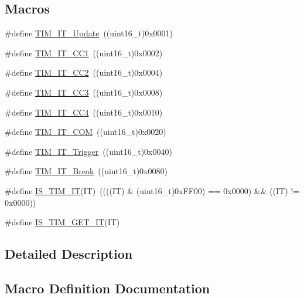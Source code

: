\subsection*{Macros}
\begin{DoxyCompactItemize}
\item 
\#define \hyperlink{group___t_i_m__interrupt__sources_ga8fb63577fec9a3e7c7f5f3eb775ee624}{T\+I\+M\+\_\+\+I\+T\+\_\+\+Update}~((uint16\+\_\+t)0x0001)
\item 
\#define \hyperlink{group___t_i_m__interrupt__sources_ga02267a938ab4722c5013fffa447cf5a6}{T\+I\+M\+\_\+\+I\+T\+\_\+\+C\+C1}~((uint16\+\_\+t)0x0002)
\item 
\#define \hyperlink{group___t_i_m__interrupt__sources_ga60f6b6c424b62ca58d3fafd8f5955e4f}{T\+I\+M\+\_\+\+I\+T\+\_\+\+C\+C2}~((uint16\+\_\+t)0x0004)
\item 
\#define \hyperlink{group___t_i_m__interrupt__sources_ga6aef020aebafd9e585283fbbaf8b841f}{T\+I\+M\+\_\+\+I\+T\+\_\+\+C\+C3}~((uint16\+\_\+t)0x0008)
\item 
\#define \hyperlink{group___t_i_m__interrupt__sources_ga1dce7f1bc32a258f2964cb7c05f413a6}{T\+I\+M\+\_\+\+I\+T\+\_\+\+C\+C4}~((uint16\+\_\+t)0x0010)
\item 
\#define \hyperlink{group___t_i_m__interrupt__sources_gaeb7eff6c39922814e7ee47c0820c3d9f}{T\+I\+M\+\_\+\+I\+T\+\_\+\+C\+OM}~((uint16\+\_\+t)0x0020)
\item 
\#define \hyperlink{group___t_i_m__interrupt__sources_ga339629d21f2490729b28905f5c04bad1}{T\+I\+M\+\_\+\+I\+T\+\_\+\+Trigger}~((uint16\+\_\+t)0x0040)
\item 
\#define \hyperlink{group___t_i_m__interrupt__sources_gad16adab3ac1a4a552a86da069702f24b}{T\+I\+M\+\_\+\+I\+T\+\_\+\+Break}~((uint16\+\_\+t)0x0080)
\item 
\#define \hyperlink{group___t_i_m__interrupt__sources_ga14fce0f8dbe0925e45b415b34bd162c9}{I\+S\+\_\+\+T\+I\+M\+\_\+\+IT}(IT)~((((IT) \& (uint16\+\_\+t)0x\+F\+F00) == 0x0000) \&\& ((\+I\+T) != 0x0000))
\item 
\#define \hyperlink{group___t_i_m__interrupt__sources_ga38e9d740c8d4ed8fcaced73816c124e6}{I\+S\+\_\+\+T\+I\+M\+\_\+\+G\+E\+T\+\_\+\+IT}(IT)
\end{DoxyCompactItemize}


\subsection{Detailed Description}


\subsection{Macro Definition Documentation}
\mbox{\label{group___t_i_m__interrupt__sources_ga38e9d740c8d4ed8fcaced73816c124e6}} 
